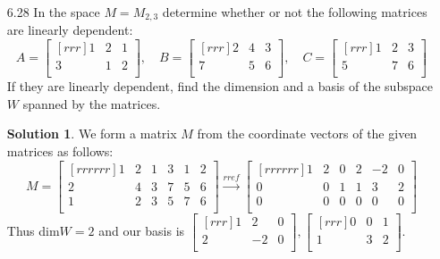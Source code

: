 \documentclass[12pt]{article}
\theoremstyle{definition}
\newtheorem*{solution}{Solution} %
\theoremstyle{plain}
\begin{document}
\begin{enumerate}
\begin{enumerate}
\begin{align*}
		&=\begin{bmatrix}[rr]x+y+z+t & x-y+z\\ x+y & x\\\end{bmatrix}\\
		&x+y+z+t = 3, \quad x-y+z = -5, \quad x+y = 6, \quad x = 7
		\end{align*}
		The solution to this system is $x=7, y=-1, z=-13, t=10$. Thus $[A]=[7,-1,-13,10]$.
	\item
		Using the resulting matrix from the previous question gives us the following system
		\[ \sysdelim{.}{.}\systeme[xyzt]{a=x+y+z+t,b=x-y+z,c=x+y,d=x} \]
		The solution to this system is $x=d, y=c-d, z=(b-d)+(c-d), t= (a-d)-(c-d)-((b-d)+(c-d))$. Thus $[A]=[d,c-d,b+c-2d,a-b-2c+2d]$.
	\end{enumerate}
	
\item[6.28] In the space $M=M_{2,3}$ determine whether or not the following matrices are linearly dependent:
\[ A=\begin{bmatrix}[rrr]1&2&1\\3&1&2\\\end{bmatrix}, \quad B=\begin{bmatrix}[rrr]2&4&3\\7&5&6\\\end{bmatrix}, \quad C=\begin{bmatrix}[rrr]1&2&3\\5&7&6\\\end{bmatrix} \]
If they are linearly dependent, find the dimension and a basis of the subspace $W$ spanned by the matrices.
	\begin{solution}
	We form a matrix $M$ from the coordinate vectors of the given matrices as follows:
	\[ M=\begin{bmatrix}[rrrrrr]1&2&1&3&1&2\\2&4&3&7&5&6\\1&2&3&5&7&6\\\end{bmatrix} \xrightarrow[]{rref} \begin{bmatrix}[rrrrrr]1&2&0&2&-2&0\\0&0&1&1&3&2\\0&0&0&0&0&0\\\end{bmatrix}\]
	Thus dim$W=2$ and our basis is $\begin{bmatrix}[rrr]1&2&0\\2&-2&0\\\end{bmatrix},\begin{bmatrix}[rrr]0&0&1\\1&3&2\\\end{bmatrix}$.
	\end{solution}


\end{enumerate}
\end{document}
